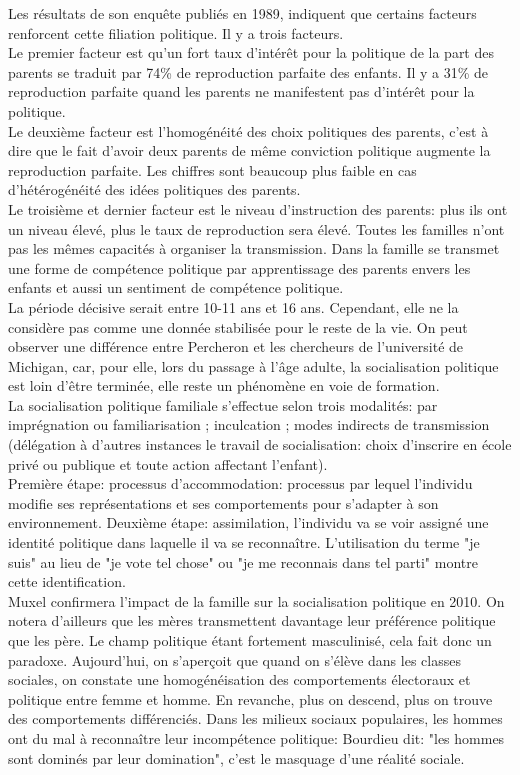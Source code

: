 \documentclass[12pt, a4paper, openany]{book}
\begin{document}
Les résultats de son enquête publiés en 1989, indiquent que certains facteurs renforcent cette filiation politique. Il y a trois facteurs. \\
Le premier facteur est qu'un fort taux d'intérêt pour la politique de la part des parents se traduit par 74\% de reproduction parfaite des enfants. Il y a 31\% de reproduction parfaite quand les parents ne manifestent pas d'intérêt pour la politique. \\
Le deuxième facteur est l'homogénéité des choix politiques des parents, c'est à dire que le fait d'avoir deux parents de même conviction politique augmente la reproduction parfaite. Les chiffres sont beaucoup plus faible en cas d'hétérogénéité des idées politiques des parents. \\
Le troisième et dernier facteur est le niveau d'instruction des parents: plus ils ont un niveau élevé, plus le taux de reproduction sera élevé. Toutes les familles n'ont pas les mêmes capacités à organiser la transmission. Dans la famille se transmet une forme de compétence politique par apprentissage des parents envers les enfants et aussi un sentiment de compétence politique. \\
La période décisive serait entre 10-11 ans et 16 ans. Cependant, elle ne la considère pas comme une donnée stabilisée pour le reste de la vie. On peut observer une différence entre Percheron et les chercheurs de l'université de Michigan, car, pour elle, lors du passage à l'âge adulte, la socialisation politique est loin d'être terminée, elle reste un phénomène en voie de formation. \\
La socialisation politique familiale s'effectue selon trois modalités: par imprégnation ou familiarisation ; inculcation ; modes indirects de transmission (délégation à d'autres instances le travail de socialisation: choix d'inscrire en école privé ou publique et toute action affectant l'enfant). \\
Première étape: processus d'accommodation: processus par lequel l'individu modifie ses représentations et ses comportements pour s'adapter à son environnement. Deuxième étape: assimilation, l'individu va se voir assigné une identité politique dans laquelle il va se reconnaître. L'utilisation du terme "je suis" au lieu de "je vote tel chose" ou "je me reconnais dans tel parti" montre cette identification. \\
Muxel confirmera l'impact de la famille sur la socialisation politique en 2010. On notera d'ailleurs que les mères transmettent davantage leur préférence politique que les père. Le champ politique étant fortement masculinisé, cela fait donc un paradoxe. Aujourd'hui, on s'aperçoit que quand on s'élève dans les classes sociales, on constate une homogénéisation des comportements électoraux et politique entre femme et homme. En revanche, plus on descend, plus on trouve des comportements différenciés. Dans les milieux sociaux populaires, les hommes ont du mal à reconnaître leur incompétence politique: Bourdieu dit: "les hommes sont dominés par leur domination", c'est le masquage d'une réalité sociale. \\
\end{document}
